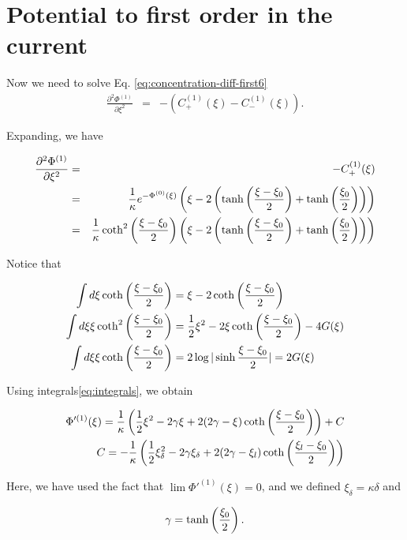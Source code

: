 \newpage


\section{Potential to first order in the current}

Now we need to solve Eq. \ref{eq:concentration-diff-first6}
\begin{eqnarray}
\frac{\partial^2  \Phi^{(1)}}{\partial \xi^2} &=& -(C^{(1)}_{+}(\xi)-C^{(1)}_{-}(\xi)).
\end{eqnarray}

Expanding, we have 

\begin{eqnarray}\nonumber
\frac{\partial^2  \Phi^{(1)}}{\partial \xi^2} &=& -C^{(1)}_{+}(\xi)\\
&=& \frac{1}{\kappa} e^{-\Phi^{(0)}(\xi)}\left(\xi-2\left({\tanh\left({\frac{\xi-\xi_0}{2}}\right) + \tanh\left({\frac{\xi_0}{2}}\right)}\right)\right)\\
&=& \frac{1}{\kappa} \coth^2\left({\frac{\xi-\xi_0}{2}}\right)\left(\xi-2\left({\tanh\left({\frac{\xi-\xi_0}{2}}\right) + \tanh\left({\frac{\xi_0}{2}}\right)}\right)\right)
\end{eqnarray}


Notice that

\begin{eqnarray}
 \int d\xi \coth\left({\frac{\xi-\xi_0}{2}}\right) &= \xi - 2 \coth\left({\frac{\xi-\xi_0}{2}}\right)\\
 \int d\xi \xi \coth^2\left({\frac{\xi-\xi_0}{2}}\right) &= \frac{1}{2}\xi^2 - 2 \xi\coth\left({\frac{\xi-\xi_0}{2}}\right)-4G(\xi) \\
 \int d\xi \xi \coth\left({\frac{\xi-\xi_0}{2}}\right) &= 2\log{|\sinh\frac{\xi-\xi_0}{2}|} = 2G(\xi)
 \label{eq:integrals}
\end{eqnarray}

Using integrals\ref{eq:integrals}, we obtain

\begin{eqnarray}
\nonumber
\Phi'^{(1)}(\xi) = \frac{1}{\kappa} \left({\frac{1}{2}\xi^2 -2\gamma \xi + 2(2\gamma-\xi)\coth\left({\frac{\xi-\xi_0}{2}}\right)}\right) + C\\
C = -\frac{1}{\kappa} \left({\frac{1}{2}\xi_\delta^2 -2\gamma \xi_\delta + 2(2\gamma-\xi_l)\coth\left({\frac{\xi_l-\xi_0}{2}}\right)}\right)
\end{eqnarray}

Here, we have used the fact that $\lim \Phi'^{(1)}(\xi) = 0$, and  we defined $\xi_\delta = \kappa \delta$ and


\begin{equation}
\nonumber
\gamma = \tanh\left({\frac{\xi_0}{2}}\right).
\end{equation}

